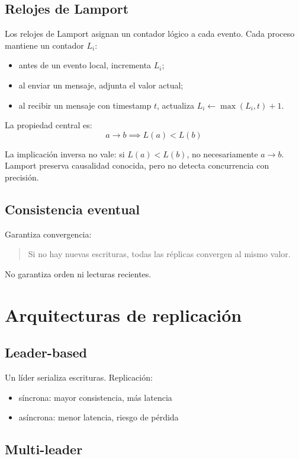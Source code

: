 \documentclass[variant=apuntes,cover=institutional,mode=screen]{ua-engineering-v6-article}
\begin{document}
\subsection{Relojes de Lamport}

Los relojes de Lamport asignan un contador lógico a cada evento. Cada proceso mantiene un contador $L_i$:
\begin{itemize}
\item antes de un evento local, incrementa $L_i$;
\item al enviar un mensaje, adjunta el valor actual;
\item al recibir un mensaje con timestamp $t$, actualiza $L_i \leftarrow \max(L_i,t)+1$.
\end{itemize}

La propiedad central es:
\[
a \rightarrow b \implies L(a) < L(b)
\]

La implicación inversa no vale: si $L(a) < L(b)$, no necesariamente $a \rightarrow b$. Lamport preserva causalidad conocida, pero no detecta concurrencia con precisión.

\subsection{Consistencia eventual}

Garantiza convergencia:
\begin{quote}
Si no hay nuevas escrituras, todas las réplicas convergen al mismo valor.
\end{quote}

No garantiza orden ni lecturas recientes.

\section{Arquitecturas de replicación}

\subsection{Leader-based}

Un líder serializa escrituras. Replicación:
\begin{itemize}
\item síncrona: mayor consistencia, más latencia
\item asíncrona: menor latencia, riesgo de pérdida
\end{itemize}

\subsection{Multi-leader}
\end{document}
